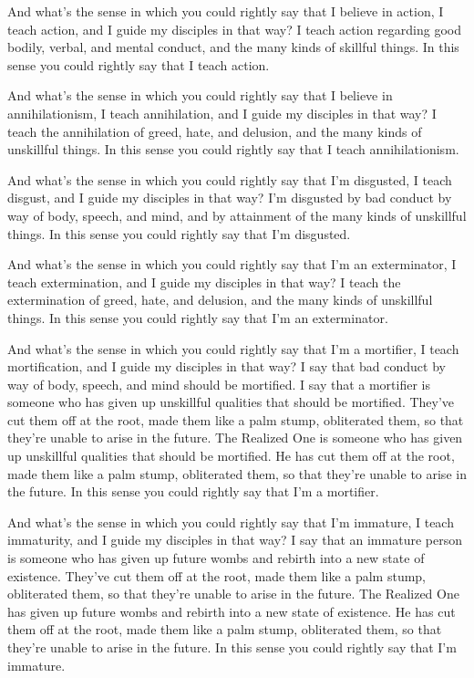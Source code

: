 \documentclass[12pt,openany]{book}%
\begin{document}
And what’s the sense in which you could rightly say that I believe in action, I teach action, and I guide my disciples in that way? I teach action regarding good bodily, verbal, and mental conduct, and the many kinds of skillful things. In this sense you could rightly say that I teach action. 

And what’s the sense in which you could rightly say that I believe in annihilationism, I teach annihilation, and I guide my disciples in that way? I teach the annihilation of greed, hate, and delusion, and the many kinds of unskillful things. In this sense you could rightly say that I teach annihilationism. 

And what’s the sense in which you could rightly say that I’m disgusted, I teach disgust, and I guide my disciples in that way? I’m disgusted by bad conduct by way of body, speech, and mind, and by attainment of the many kinds of unskillful things. In this sense you could rightly say that I’m disgusted. 

And what’s the sense in which you could rightly say that I'm an exterminator, I teach extermination, and I guide my disciples in that way? I teach the extermination of greed, hate, and delusion, and the many kinds of unskillful things. In this sense you could rightly say that I’m an exterminator. 

And what’s the sense in which you could rightly say that I’m a mortifier, I teach mortification, and I guide my disciples in that way? I say that bad conduct by way of body, speech, and mind should be mortified. I say that a mortifier is someone who has given up unskillful qualities that should be mortified. They’ve cut them off at the root, made them like a palm stump, obliterated them, so that they’re unable to arise in the future. The Realized One is someone who has given up unskillful qualities that should be mortified. He has cut them off at the root, made them like a palm stump, obliterated them, so that they’re unable to arise in the future. In this sense you could rightly say that I’m a mortifier. 

And what’s the sense in which you could rightly say that I’m immature, I teach immaturity, and I guide my disciples in that way? I say that an immature person is someone who has given up future wombs and rebirth into a new state of existence. They’ve cut them off at the root, made them like a palm stump, obliterated them, so that they’re unable to arise in the future. The Realized One has given up future wombs and rebirth into a new state of existence. He has cut them off at the root, made them like a palm stump, obliterated them, so that they’re unable to arise in the future. In this sense you could rightly say that I’m immature. 
\end{document}
